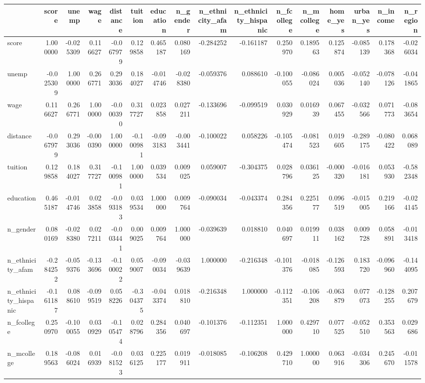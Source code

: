 \begin{tabu}{lrrrrrrrrrrrrrrr}
\toprule
 & score & unemp & wage & distance & tuition & education & n\_gender & n\_ethnicity\_afam & n\_ethnicity\_hispanic & n\_fcollege & n\_mcollege & home\_yes & urban\_yes & n\_income & n\_region \\
\midrule
score & 1.000000 & -0.025309 & 0.116627 & -0.067979 & 0.129858 & 0.465187 & 0.080169 & -0.284252 & -0.161187 & 0.250970 & 0.189563 & 0.125874 & -0.085139 & 0.178368 & -0.026034 \\
unemp & -0.025309 & 1.000000 & 0.266771 & 0.293036 & 0.184027 & -0.014746 & -0.028380 & -0.059376 & 0.088610 & -0.100055 & -0.086024 & 0.005036 & -0.052140 & -0.078126 & -0.041865 \\
wage & 0.116627 & 0.266771 & 1.000000 & -0.000390 & 0.317727 & 0.023858 & 0.027211 & -0.133696 & -0.099519 & 0.030929 & 0.016939 & 0.067455 & -0.032566 & 0.071773 & -0.083654 \\
distance & -0.067979 & 0.293036 & -0.000390 & 1.000000 & -0.100981 & -0.093183 & -0.003441 & -0.100022 & 0.058226 & -0.105474 & -0.081523 & 0.019605 & -0.289175 & -0.080422 & 0.068089 \\
tuition & 0.129858 & 0.184027 & 0.317727 & -0.100981 & 1.000000 & 0.039534 & 0.009025 & 0.059007 & -0.304375 & 0.028796 & 0.036125 & -0.000320 & -0.016181 & 0.053930 & -0.582348 \\
education & 0.465187 & -0.014746 & 0.023858 & -0.093183 & 0.039534 & 1.000000 & 0.009764 & -0.090034 & -0.043374 & 0.284356 & 0.225177 & 0.096519 & -0.015005 & 0.219166 & -0.024145 \\
n\_gender & 0.080169 & -0.028380 & 0.027211 & -0.003441 & 0.009025 & 0.009764 & 1.000000 & -0.039639 & 0.018810 & 0.040697 & 0.019911 & 0.038162 & 0.009728 & 0.058891 & -0.013418 \\
n\_ethnicity\_afam & -0.284252 & -0.059376 & -0.133696 & -0.100022 & 0.059007 & -0.090034 & -0.039639 & 1.000000 & -0.216348 & -0.101376 & -0.018085 & -0.126593 & 0.183720 & -0.096960 & -0.144095 \\
n\_ethnicity\_hispanic & -0.161187 & 0.088610 & -0.099519 & 0.058226 & -0.304375 & -0.043374 & 0.018810 & -0.216348 & 1.000000 & -0.112351 & -0.106208 & -0.063879 & 0.077073 & -0.128255 & 0.207679 \\
n\_fcollege & 0.250970 & -0.100055 & 0.030929 & -0.105474 & 0.028796 & 0.284356 & 0.040697 & -0.101376 & -0.112351 & 1.000000 & 0.429710 & 0.077525 & -0.052510 & 0.353563 & 0.029686 \\
n\_mcollege & 0.189563 & -0.086024 & 0.016939 & -0.081523 & 0.036125 & 0.225177 & 0.019911 & -0.018085 & -0.106208 & 0.429710 & 1.000000 & 0.063916 & -0.034306 & 0.245670 & -0.011578 \\

\end{tabu}

